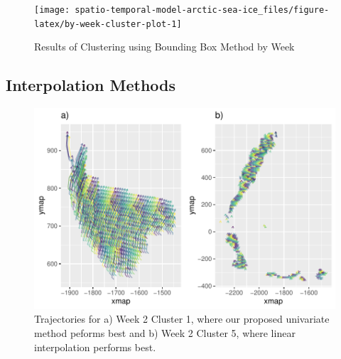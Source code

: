 \documentclass[12pt]{article}
\begin{document}
\begin{figure}[tbp]

{\centering \texttt{[image: spatio-temporal-model-arctic-sea-ice\_files/figure-latex/by-week-cluster-plot-1]} 

}

\caption{Results of Clustering using Bounding Box Method by Week}\label{fig:by-week-cluster-plot}
\end{figure}

\hypertarget{interpolation-methods}{%
\subsection{Interpolation Methods}\label{interpolation-methods}}

\begin{figure}[tbp]

{\centering \includegraphics[width=\linewidth,]{spatio-temporal-model-arctic-sea-ice_files/figure-latex/int-best-plots-1} 

}

\caption{Trajectories for a) Week 2 Cluster 1, where our proposed univariate method peforms best and b) Week 2 Cluster 5, where linear interpolation performs best.}\label{fig:int-best-plots}
\end{figure}
\end{document}
